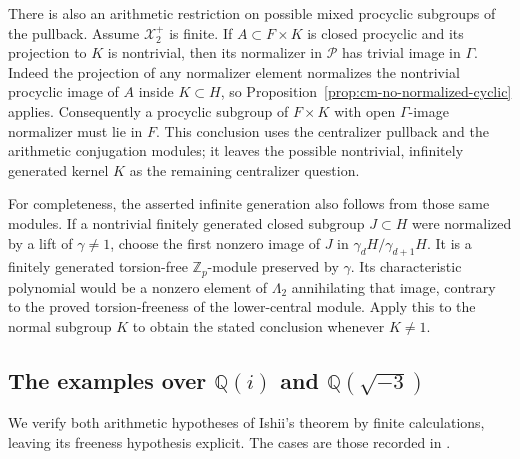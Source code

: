 \documentclass[11pt]{article}
\theoremstyle{definition}\newtheorem{definition}[theorem]{Definition}
\begin{document}
There is also an arithmetic restriction on possible mixed
procyclic subgroups of the pullback.  Assume
\(\mathcal X_2^+\) is finite.  If \(A\subset F\times K\)
is closed procyclic and its projection to \(K\) is nontrivial,
then its normalizer in \(\mathcal P\) has trivial image
in \(\Gamma\).  Indeed the projection of any normalizer
element normalizes the nontrivial procyclic image of \(A\)
inside \(K\subset H\), so
Proposition~\ref{prop:cm-no-normalized-cyclic} applies.
Consequently a procyclic subgroup of \(F\times K\)
with open \(\Gamma\)-image normalizer must lie in \(F\).
This conclusion uses the centralizer pullback and
the arithmetic conjugation modules; it leaves the possible
nontrivial, infinitely generated kernel \(K\) as the
remaining centralizer question.

For completeness, the asserted infinite generation also
follows from those same modules.  If a nontrivial finitely
generated closed subgroup \(J\subset H\) were normalized
by a lift of \(\gamma\neq1\), choose the first nonzero
image of \(J\) in \(\gamma_dH/\gamma_{d+1}H\).
It is a finitely generated torsion-free
\(\mathbb Z_p\)-module preserved by \(\gamma\).
Its characteristic polynomial would be a nonzero
element of \(\Lambda_2\) annihilating that image,
contrary to the proved torsion-freeness of the
lower-central module.  Apply this to the normal subgroup
\(K\) to obtain the stated conclusion whenever \(K\neq1\).


\subsection{The examples over \(\mathbb Q(i)\) and
\(\mathbb Q(\sqrt{-3})\)}

We verify both arithmetic hypotheses of Ishii's theorem by
finite calculations, leaving its freeness hypothesis explicit.
The cases are those recorded in
\cite[Example 1.2, p.~3]{Ishii}.
\end{document}
